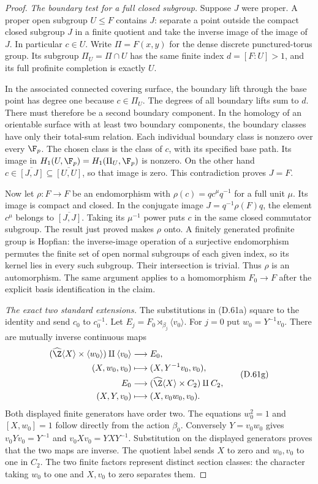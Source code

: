 \begin{proof}
\emph{The boundary test for a full closed subgroup.}
Suppose $J$ were proper. A proper open subgroup
$U\leq F$ contains $J$: separate a point outside
the compact closed subgroup $J$ in a finite
quotient and take the inverse image of the image
of $J$. In particular $c\in U$.
Write $\Pi=F(x,y)$ for the dense discrete
punctured-torus group. Its subgroup
$\Pi_U=\Pi\cap U$ has the same finite index
$d=[F:U]>1$, and its full profinite completion
is exactly $U$.

In the associated connected covering surface,
the boundary lift through the base point has
degree one because $c\in\Pi_U$.
The degrees of all boundary lifts sum to $d$.
There must therefore be a second boundary
component. In the homology of an orientable
surface with at least two boundary components,
the boundary classes have only their total-sum
relation. Each individual boundary class is
nonzero over every $\F_p$.
The chosen class is the class of $c$, with its
specified base path. Its image in
$H_1(U,\F_p)=H_1(\Pi_U,\F_p)$ is nonzero.
On the other hand
$c\in\overline{[J,J]}\subseteq\overline{[U,U]}$,
so that image is zero. This contradiction proves
$J=F$.

Now let $\rho:F\to F$ be an endomorphism with
$\rho(c)=q c^\mu q^{-1}$ for a full unit $\mu$.
Its image is compact and closed. In the conjugate
image $J=q^{-1}\rho(F)q$, the element $c^\mu$
belongs to $\overline{[J,J]}$.
Taking its $\mu^{-1}$ power puts $c$ in the same
closed commutator subgroup. The result just proved
makes $\rho$ onto.
A finitely generated profinite group is Hopfian:
the inverse-image operation of a surjective
endomorphism permutes the finite set of open
normal subgroups of each given index, so its
kernel lies in every such subgroup. Their
intersection is trivial. Thus $\rho$ is an
automorphism.
The same argument applies to a homomorphism
$F_0\to F$ after the explicit basis identification
in the claim.

\emph{The exact two standard extensions.}
The substitutions in (D.61a) square to the
identity and send $c_0$ to $c_0^{-1}$.
Let $E_j=F_0\rtimes_{\beta_j}\langle v_0\rangle$.
For $j=0$ put $w_0=Y^{-1}v_0$.
There are mutually inverse continuous maps
\[
 \begin{aligned}
 (\widehat\Z\langle X\rangle\times\langle w_0\rangle)
                   \amalg\langle v_0\rangle
       &\longrightarrow E_0,\\
 (X,w_0,v_0)&\longmapsto(X,Y^{-1}v_0,v_0),\\
 E_0&\longrightarrow
  (\widehat\Z\langle X\rangle\times C_2)\amalg C_2,\\
 (X,Y,v_0)&\longmapsto(X,v_0w_0,v_0).
 \end{aligned}                                             \tag{D.61g}
\]
Both displayed finite generators have order
two. The equations $w_0^2=1$ and $[X,w_0]=1$
follow directly from the action $\beta_0$.
Conversely $Y=v_0w_0$ gives
$v_0Yv_0=Y^{-1}$ and
$v_0Xv_0=YXY^{-1}$.
Substitution on the displayed generators proves
that the two maps are inverse.
The quotient label sends $X$ to zero and
$w_0,v_0$ to one in $C_2$.
The two finite factors represent distinct
section classes: the character taking $w_0$
to one and $X,v_0$ to zero separates them.


\end{proof}
